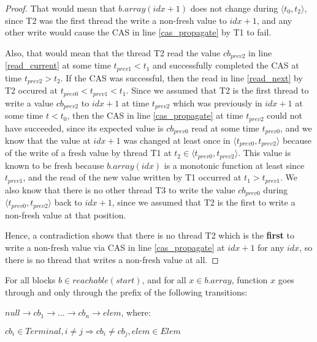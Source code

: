 \documentclass[runningheads,a4paper]{llncs}
\begin{document}
\begin{proof}
That would mean that $b.array(idx + 1)$ does not change during $\langle t_0, t_2 \rangle$,
since T2 was the first thread the write a non-fresh value to $idx + 1$, and any
other write would cause the CAS in line \ref{cas_propagate} by T1 to fail.

Also, that would mean that the thread T2 read the value
$cb_{prev2}$ in line \ref{read_current} at some time $t_{prev1} < t_1$
and successfully completed the CAS at time $t_{prev2} > t_2$. If the
CAS was successful, then the read in line \ref{read_next} by T2
occured at $t_{prev0} < t_{prev1} < t_1$. Since we assumed that T2 is the
first thread to write a value $cb_{prev2}$ to $idx + 1$ at time $t_{prev2}$
which was previously in $idx + 1$ at some time $t < t_0$, then the CAS
in line \ref{cas_propagate} at time $t_{prev2}$ could not have succeeded,
since its expected value is $cb_{prev0}$ read at some time $t_{prev0}$, and
we know that the value at $idx + 1$ was changed at least once in $\langle t_{prev0}, t_{prev2} \rangle$
because of the write of a fresh value by thread T1 at $t_2 \in \langle t_{prev0}, t_{prev2} \rangle$.
This value is known to be fresh because $b.array(idx)$ is a monotonic
function at least since $t_{prev1}$, and the read of the new value
written by T1 occurred at $t_1 > t_{prev1}$.
We also know that there is no other thread T3 to write the value
 $cb_{prev0}$ during $\langle t_{prev0}, t_{prev2} \rangle$
back to $idx + 1$, since we assumed that T2 is the first to write
a non-fresh value at that position.

Hence, a contradiction shows that there is no thread T2 which is the \textbf{first}
to write a non-fresh value via CAS in line \ref{cas_propagate} at $idx + 1$
for any $idx$, so there is no thread that writes a non-fresh value at all.
\end{proof}


\begin{lemma}[Lifecycle]
For all blocks $b \in reachable(start)$, and for all $x \in b.array$, function $x$ goes through and only through the prefix of the following transitions:

$null \rightarrow cb_1 \rightarrow \dots \rightarrow cb_n \rightarrow elem$, where:

$cb_i \in Terminal, i \neq j \Rightarrow cb_i \neq cb_j, elem \in Elem$
\end{lemma}
\end{document}
